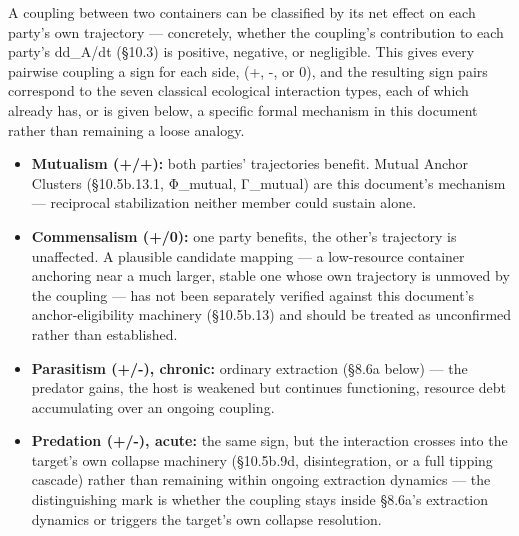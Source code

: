\documentclass[
]{article}
\begin{document}
A coupling between two containers can be classified by its net effect on
each party's own trajectory --- concretely, whether the coupling's
contribution to each party's dd\_A/dt (§10.3) is positive, negative, or
negligible. This gives every pairwise coupling a sign for each side, (+,
-, or 0), and the resulting sign pairs correspond to the seven classical
ecological interaction types, each of which already has, or is given
below, a specific formal mechanism in this document rather than
remaining a loose analogy.

\begin{itemize}
\item
  \textbf{Mutualism (+/+):} both parties' trajectories benefit. Mutual
  Anchor Clusters (§10.5b.13.1, Φ\_mutual, Γ\_mutual) are this
  document's mechanism --- reciprocal stabilization neither member could
  sustain alone.
\item
  \textbf{Commensalism (+/0):} one party benefits, the other's
  trajectory is unaffected. A plausible candidate mapping --- a
  low-resource container anchoring near a much larger, stable one whose
  own trajectory is unmoved by the coupling --- has not been separately
  verified against this document's anchor-eligibility machinery
  (§10.5b.13) and should be treated as unconfirmed rather than
  established.
\item
  \textbf{Parasitism (+/-), chronic:} ordinary extraction (§8.6a below)
  --- the predator gains, the host is weakened but continues
  functioning, resource debt accumulating over an ongoing coupling.
\item
  \textbf{Predation (+/-), acute:} the same sign, but the interaction
  crosses into the target's own collapse machinery (§10.5b.9d,
  disintegration, or a full tipping cascade) rather than remaining
  within ongoing extraction dynamics --- the distinguishing mark is
  whether the coupling stays inside §8.6a's extraction dynamics or
  triggers the target's own collapse resolution.
\end{itemize}
\end{document}
